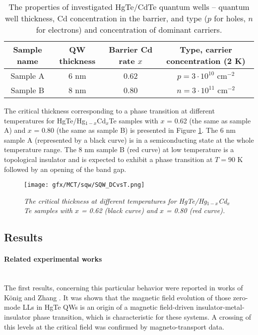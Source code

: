 \documentclass[titlepage,a4paper]{book}
\newcommand{\wciecie}{\quad\phantom{v}}
\newcommand{\myparagraph}[1]{\paragraph{#1}\mbox{}\\}
\begin{document}
\begin{table}[h]
\label{tab:MCT_QW_properties}
\caption{The properties of investigated HgTe/CdTe quantum wells -- quantum well thickness, Cd concentration in the barrier, and type ($p$ for holes, $n$ for electrons) and concentration of dominant carriers.}
\vspace{10pt}
\centering
\begin{tabular}{ c | c | c | c}	
\textbf{Sample name} & \textbf{QW thickness} & \textbf{Barrier Cd rate $x$} & \textbf{Type, carrier concentration (2 K)}\\
\hline\hline
Sample A & 6 nm & 0.62 & $p = 3\cdot10^{10}$ cm$^{-2}$\\ \hline
Sample B & 8 nm & 0.80 & $n = 3\cdot10^{11}$ cm$^{-2}$\\ \hline\hline 
\end{tabular}
\end{table}

The critical thickness corresponding to a phase transition at different temperatures for HgTe/Hg$_{1-x}$Cd$_{x}$Te samples with $x$ = 0.62 (the same as sample A) and $x$ = 0.80 (the same as sample B) is presented in Figure \ref{fig:SQW_DCvsT}. The 6 nm sample A (represented by a black curve) is in a semiconducting state at the whole temperature range. The 8 nm sample B (red curve) at low temperature is a topological insulator and is expected to exhibit a phase transition at $T = 90$ K followed by an opening of the band gap.

\begin{figure}[ht]
	\centering
	\texttt{[image: gfx/MCT/sqw/SQW\_DCvsT.png]}
	\vspace{-10pt}
	\caption{\textit{The critical thickness at different temperatures for HgTe/Hg$_{1-x}$Cd$_{x}$Te samples with $x$ = 0.62 (black curve) and $x$ = 0.80 (red curve).}}
	\label{fig:SQW_DCvsT}
\end{figure} 

\subsection{Results}
\label{sec:MCT_QW}
\wciecie

\myparagraph{Related experimental works}
The first results, concerning this particular behavior were reported in works of König \cite{Konig_Topology} and Zhang \cite{Zhang_Topology}. It was shown that the magnetic field evolution of those zero-mode LLs in HgTe QWs is an origin of a magnetic field-driven insulator-metal-insulator phase transition, which is characteristic for these systems. A crossing of this levels at the critical field was confirmed \cite{Konig_Topology} by magneto-transport data.
\end{document}
